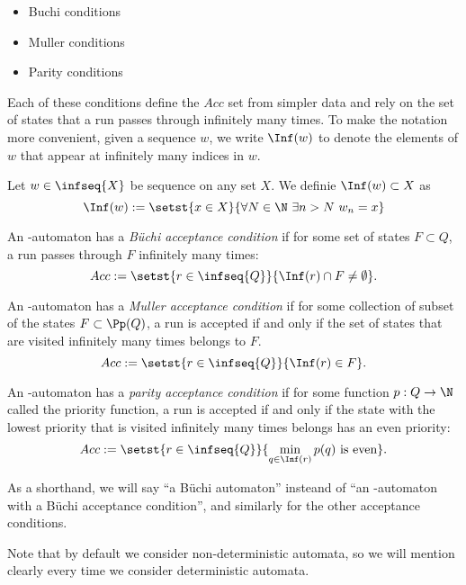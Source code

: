\begin{multicols}{2}
\begin{itemize}
    \item Buchi conditions
    \item Muller conditions
    \item Parity conditions
\end{itemize}
\end{multicols}

Each of these conditions define the $Acc$ set
from simpler data and rely on the set of states that
a run passes through infinitely many times.
To make the notation more convenient, given a sequence
$w$, we write $\Inf(w)$ to denote the
elements of $w$ that appear at infinitely many indices in $w$.

\begin{definition}
    Let $w \in \infseq{X}$ be sequence on any set $X$.
    We definie $\Inf(w) \subset X$ as
    \[
        \Inf(w) := \setst{x \in X}{
            \forall N \in \N~
            \exists n > N~
            w_n = x
        }
    \]
\end{definition}

\begin{definition}
    An \w-automaton has a \emph{Büchi acceptance condition}
    if for some set of states $F \subset Q$,
    a run passes through $F$ infinitely many times:
    \[
        Acc := \setst{
            r \in \infseq{Q}
        }{
            \Inf(r) \cap F \neq \emptyset
        }.
    \]

    An \w-automaton has a \emph{Muller acceptance condition}
    if for some collection of subset of the states $F \subset \Pp(Q)$,
    a run is accepted if and only if the set of states that
    are visited infinitely many times belongs to $F$.
    \[
        Acc := \setst{
            r \in \infseq{Q}
        }{
            \Inf(r) \in F
        }.
    \]

    An \w-automaton has a \emph{parity acceptance condition}
    if for some function $p : Q \to \N$ called the priority function,
    a run is accepted if and only if the state with the lowest priority
    that is visited infinitely many times belongs has an even priority:
    \[
        Acc := \setst{
            r \in \infseq{Q}
        }{
            \min_{q \in \Inf(r)} p(q) \text{ is even}
        }.
    \]
\end{definition}

\begin{remark}
    As a shorthand, we will say ``a Büchi automaton''
    insteand of ``an \w-automaton with a Büchi acceptance condition'',
    and similarly for the other acceptance conditions.

    Note that by default we consider non-deterministic automata,
    so we will mention clearly every time we consider deterministic
    automata.
\end{remark}

